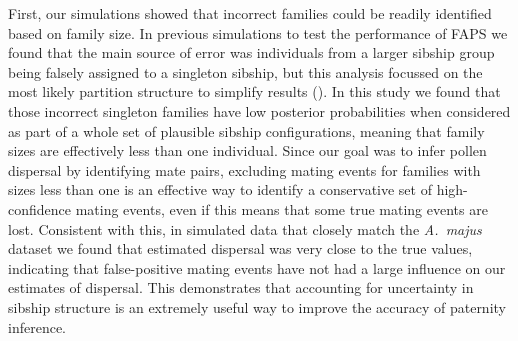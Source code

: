\documentclass[10pt, a4paper, twocolumn]{article} %
\begin{document}
First, our simulations showed that incorrect families could be readily identified based on family size.
In previous simulations to test the performance of FAPS we found that the main source of error was individuals from a larger sibship group being falsely assigned to a singleton sibship, but this analysis focussed on the most likely partition structure to simplify results (\cite{ellis2018efficient}).
In this study we found that those incorrect singleton families have low posterior probabilities when considered as part of a whole set of plausible sibship configurations, meaning that family sizes are effectively less than one individual.
Since our goal was to infer pollen dispersal by identifying mate pairs, excluding mating events for families with sizes less than one is an effective way to identify a conservative set of high-confidence mating events, even if this means that some true mating events are lost.
Consistent with this, in simulated data that closely match the \textit{A.~majus} dataset we found that estimated dispersal was very close to the true values, indicating that false-positive mating events have not had a large influence on our estimates of dispersal.
This demonstrates that accounting for uncertainty in sibship structure is an extremely useful way to improve the accuracy of paternity inference.
\end{document}
